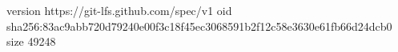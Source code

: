 version https://git-lfs.github.com/spec/v1
oid sha256:83ac9abb720d79240e00f3c18f45ec3068591b2f12c58e3630e61fb66d24dcb0
size 49248
